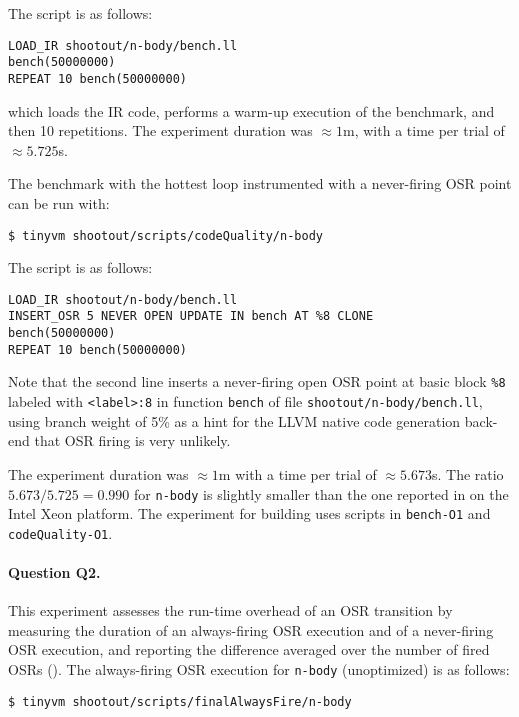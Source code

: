\noindent The script is as follows:

\begin{small}
\begin{verbatim}
LOAD_IR shootout/n-body/bench.ll
bench(50000000)
REPEAT 10 bench(50000000)
\end{verbatim}
\end{small}

\noindent which loads the IR code, performs a warm-up execution of the benchmark, and then 10 repetitions. The experiment duration was $\approx1$m, with a time per trial of $\approx5.725$s. 

\ifseparateAEdoc{\noindent}{}The benchmark with the hottest loop instrumented with a never-firing OSR point can be run with:

\begin{small}
\begin{verbatim}
$ tinyvm shootout/scripts/codeQuality/n-body
\end{verbatim}
\end{small}

\noindent The script is as follows:

\begin{small}
\begin{verbatim}
LOAD_IR shootout/n-body/bench.ll
INSERT_OSR 5 NEVER OPEN UPDATE IN bench AT %8 CLONE
bench(50000000)
REPEAT 10 bench(50000000)
\end{verbatim}
\end{small}

\noindent Note that the second line inserts a never-firing open OSR point at basic block {\tt \%8} labeled with {\tt <label>:8} in function {\tt bench} of file {\tt shootout/n-body/bench.ll}, using branch weight of 5\% as a hint for the LLVM native code generation back-end that OSR firing is very unlikely. 

The experiment duration was $\approx1$m with a time per trial of $\approx5.673$s. The ratio $5.673/5.725=0.990$ for {\tt n-body} is slightly smaller than the one reported in  on the Intel Xeon platform. The experiment for building  uses scripts in {\tt bench-O1} and {\tt codeQuality-O1}.

\paragraph{Question Q2.} This experiment assesses the run-time overhead of an OSR transition by measuring the duration of an always-firing OSR execution and of a never-firing OSR execution, and reporting the difference averaged over the number of fired OSRs (). The always-firing OSR execution for {\tt n-body} (unoptimized) is as follows:
\begin{small}
\begin{verbatim}
$ tinyvm shootout/scripts/finalAlwaysFire/n-body
\end{verbatim}
\end{small}

